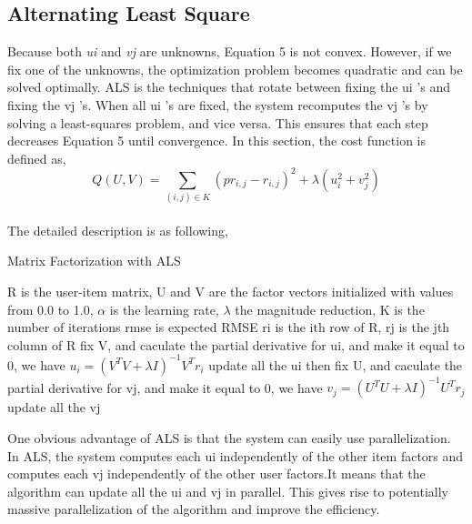 \documentclass{sig-alternate-05-2015}
\begin{document}
\subsection{Alternating Least Square}
Because both \textit{ui} and \textit{vj} are unknowns, Equation 5 is not convex. However, if we fix one of the unknowns, the optimization problem becomes quadratic and can be solved optimally. ALS is the techniques that rotate between fixing the {ui} ’s and fixing the {vj} ’s. When all {ui} ’s are fixed, the system
recomputes the {vj} ’s by solving a least-squares problem, and vice versa. This ensures that each step decreases Equation 5 until convergence. In this section, the cost function is defined as,\\
           \begin{equation}
     		Q(U, V)= {\sum\limits_{(i,j) \in K} {(pr_{i,j} - r_{i,j})}^{2} + \lambda(u_{i}^{2} + v_{j}^{2}) }
			\end{equation}
\\The detailed description is as following, \\
\begin{algorithm}
    \caption{Matrix Factorization with ALS}

    \begin{algorithmic}[2]
        \Require
            \Statex R is the user-item matrix,
            \Statex U and V are the factor vectors initialized with values from 0.0 to 1.0,
            \Statex $\alpha$ is the learning rate,
            \Statex $\lambda$ the magnitude reduction,
            \Statex K is the number of iterations
            \Statex rmse is expected RMSE
            \Statex ri is the ith row of R, rj is the jth column of R
        \State fix V, and caculate the partial derivative for ui, and make it equal to 0, we have
        \State $u_i = (V^TV+ \lambda I)^{-1}V^Tr_i$
        \State update all the ui
        \State then fix U, and caculate the partial derivative for vj, and make it equal to 0, we have
        \State $v_j = (U^TU+ \lambda I)^{-1}U^Tr_j$
        \State update all the vj
    \EndFor
    \end{algorithmic}
\end{algorithm}

One obvious advantage of ALS is that the system can easily use parallelization. In ALS,
the system computes each ui independently of the other item factors and computes each vj independently of the other user factors.It means that the algorithm can update all the ui and vj in parallel. This gives rise to potentially massive parallelization of the algorithm and improve the efficiency.
\end{document}

